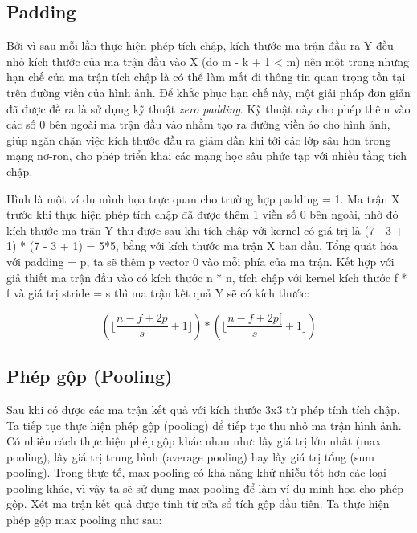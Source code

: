 \documentclass[a4paper]{article}
\begin{document}

\subsection{Padding}

Bởi vì sau mỗi lần thực hiện phép tích chập, kích thước ma trận đầu ra Y đều nhỏ kích thước của ma trận đầu vào X (do m - k + 1 < m) nên một trong những hạn chế của ma trận tích chập là có thể làm mất đi thông tin quan trọng tồn tại trên đường viền của hình ảnh. Để khắc phục hạn chế này, một giải pháp đơn giản đã được đề ra là sử dụng kỹ thuật \textit{zero padding}. Kỹ thuật này cho phép thêm vào các số 0 bên ngoài ma trận đầu vào nhằm tạo ra đường viền ảo cho hình ảnh, giúp ngăn chặn việc kích thước đầu ra giảm dần khi tới các lớp sâu hơn trong mạng nơ-ron, cho phép triển khai các mạng học sâu phức tạp với nhiều tầng tích chập.

Hình là một ví dụ mình họa trực quan cho trường hợp padding = 1. Ma trận X trước khi thực hiện phép tích chập đã được thêm 1 viền số 0 bên ngoài, nhờ đó kích thước ma trận Y thu được sau khi tích chập với kernel có giá trị là (7 - 3 + 1) * (7 - 3 + 1) = 5*5, bằng với kích thước ma trận X ban đầu. Tổng quát hóa với padding = p, ta sẽ thêm p vector 0 vào mỗi phía của ma trận. Kết hợp với giả thiết ma trận đầu vào có kích thước n * n, tích chập với kernel kích thước f * f và giá trị stride = s thì ma trận kết quả Y sẽ có kích thước: 

\begin{equation*}
( \lfloor \frac{n-f+2p}{s} + 1 \rfloor ) * ( \lfloor \frac{n-f+2p[}{s} + 1 \rfloor )
\end{equation*}


\subsection{Phép gộp (Pooling)}
Sau khi có được các ma trận kết quả với kích thước 3x3 từ phép tính tích chập. Ta tiếp tục thực hiện phép gộp (pooling) để tiếp tục thu nhỏ ma trận hình ảnh. Có nhiều cách thực hiện phép gộp khác nhau như: lấy giá trị lớn nhất (max pooling), lấy giá trị trung bình (average pooling) hay lấy giá trị tổng (sum pooling). Trong thực tế, max pooling có khả năng khử nhiễu tốt hơn các loại pooling khác, vì vậy ta sẽ sử dụng max pooling để làm ví dụ minh họa cho phép gộp. Xét ma trận kết quả được tính từ cửa sổ tích gộp đầu tiên. Ta thực hiện phép gộp max pooling như sau:
\end{document}

